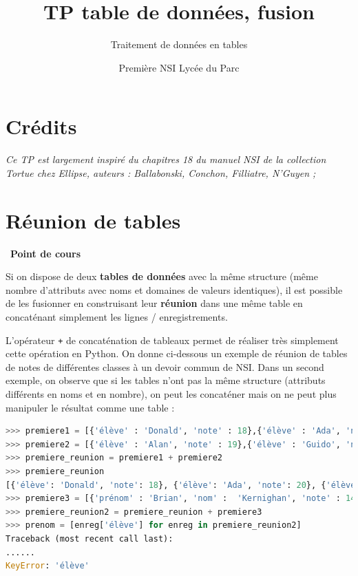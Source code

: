 \documentclass[
  11pt,
]{article}
\title{TP table de données, fusion}
\subtitle{Traitement de données en tables}
\author{Première NSI Lycée du Parc}
\date{}
\newcommand{\passthrough}[1]{#1}
\newcounter{cours}
\newenvironment{cours}[1]
{\par \medskip   \addtocounter{cours}{1} \noindent  
\begin{bclogo}[arrondi =0.1,  ombre = true, barre=none, logo=\bcbook, marge=4]{~\textbf{Point de cours} \textbf{\thecours} {\itshape #1} }  \par}
{
\end{bclogo}
 \par \bigskip }
\begin{document}
\maketitle

\renewcommand*\contentsname{Table des matières}
{
\hypersetup{linkcolor=}
\setcounter{tocdepth}{3}
\tableofcontents
}
\hypertarget{cruxe9dits}{%
\section*{Crédits}\label{cruxe9dits}}

\emph{Ce TP est largement inspiré du chapitres 18 du manuel NSI de la
collection Tortue chez Ellipse, auteurs : Ballabonski, Conchon,
Filliatre, N'Guyen ;}

\hypertarget{ruxe9union-de-tables}{%
\section{Réunion de tables}\label{ruxe9union-de-tables}}

\begin{cours}{}

Si on dispose de deux \textbf{tables de données} avec la même structure
(même nombre d'attributs avec noms et domaines de valeurs identiques),
il est possible de les fusionner en construisant leur \textbf{réunion}
dans une même table en concaténant simplement les lignes /
enregistrements.

L'opérateur \passthrough{\lstinline!+!} de concaténation de tableaux
permet de réaliser très simplement cette opération en Python. On donne
ci-dessous un exemple de réunion de tables de notes de différentes
classes à un devoir commun de NSI. Dans un second exemple, on observe
que si les tables n'ont pas la même structure (attributs différents en
noms et en nombre), on peut les concaténer mais on ne peut plus
manipuler le résultat comme une table :

\begin{lstlisting}[language=Python]
>>> premiere1 = [{'élève' : 'Donald', 'note' : 18},{'élève' : 'Ada', 'note' : 20}]
>>> premiere2 = [{'élève' : 'Alan', 'note' : 19},{'élève' : 'Guido', 'note' : 12}]
>>> premiere_reunion = premiere1 + premiere2
>>> premiere_reunion
[{'élève': 'Donald', 'note': 18}, {'élève': 'Ada', 'note': 20}, {'élève': 'Alan', 'note': 19}, {'élève': 'Guido', 'note': 12}]
>>> premiere3 = [{'prénom' : 'Brian', 'nom' :  'Kernighan', 'note' : 14},{'prénom' : 'Linus', 'nom' : 'Torvalds', 'note' : 8}]
>>> premiere_reunion2 = premiere_reunion + premiere3
>>> prenom = [enreg['élève'] for enreg in premiere_reunion2]
Traceback (most recent call last):
......
KeyError: 'élève'
\end{lstlisting}

\end{cours}
\end{document}
